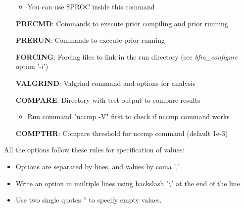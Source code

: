 \begin{itemize}
  \begin{itemize}
  \item You can use \$PROC inside this command
  \end{itemize}
\item[{\bf PRECMD}:] Commands to execute prior compiling and prior running
\item[{\bf PRERUN}:] Commands to execute prior running 
\item[{\bf FORCING}:] Forcing files to link in the run directory (see {\it bfm\_configure} option '-i')
\item[{\bf VALGRIND}:] Valgrind command and options for analysis
\item[{\bf COMPARE}:] Directory with test output to compare results
  \begin{itemize}
  \item Run command "nccmp -V" first to check if nccmp command works
  \end{itemize}
\item[{\bf COMPTHR}:] Compare threshold for nccmp command (default 1e-3)
\end{itemize}\bigskip

All the options follow these rules for specification of values: 
\begin{itemize}
\item Options are separated by lines, and values by coma ','
\item Write an option in multiple lines using backslash '\textbackslash' at the end of the line
\item Use two single quotes '' to specify empty values.
\end{itemize}\bigskip

